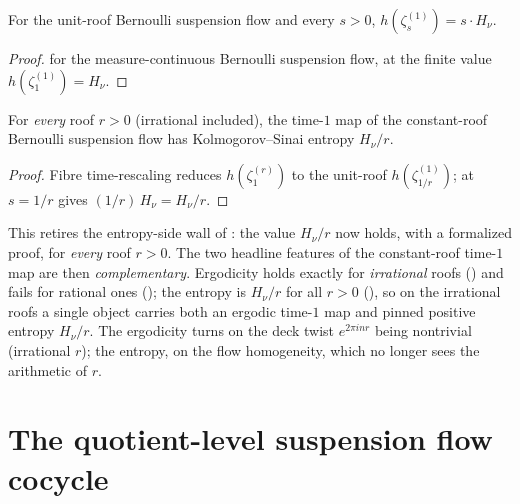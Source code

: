 \begin{theorem}\label{thm:flow-timeS}
  \leanok
  For the unit-roof Bernoulli suspension flow and every $s > 0$,
  $h(\zeta^{(1)}_s) = s \cdot H_\nu$.
\end{theorem}
\begin{proof}\leanok
   for the measure-continuous Bernoulli suspension flow, at the finite
  value $h(\zeta^{(1)}_1) = H_\nu$.
\end{proof}

\begin{theorem}\label{thm:flow-timeOneAll}
  \leanok
  For \emph{every} roof $r > 0$ (irrational included), the time-$1$ map of the constant-roof
  Bernoulli suspension flow has Kolmogorov--Sinai entropy $H_\nu/r$.
\end{theorem}
\begin{proof}\leanok
  Fibre time-rescaling reduces $h(\zeta^{(r)}_1)$ to the unit-roof $h(\zeta^{(1)}_{1/r})$;
   at $s = 1/r$ gives $(1/r)\,H_\nu = H_\nu/r$.
\end{proof}

This retires the entropy-side wall of : the value $H_\nu/r$ now holds,
with a formalized proof, for \emph{every} roof $r > 0$. The two headline features of the constant-roof
time-$1$ map are then \emph{complementary}. Ergodicity holds exactly for \emph{irrational} roofs
() and fails for rational ones (); the entropy
is $H_\nu/r$ for all $r > 0$ (), so on the irrational roofs a single object
carries both an ergodic time-$1$ map and pinned positive entropy $H_\nu/r$. The ergodicity turns on
the deck twist $e^{2\pi i n r}$ being nontrivial (irrational $r$); the entropy, on the flow
homogeneity, which no longer sees the arithmetic of $r$.

\section{The quotient-level suspension flow cocycle}\label{sec:susp-quotientCocycle}

